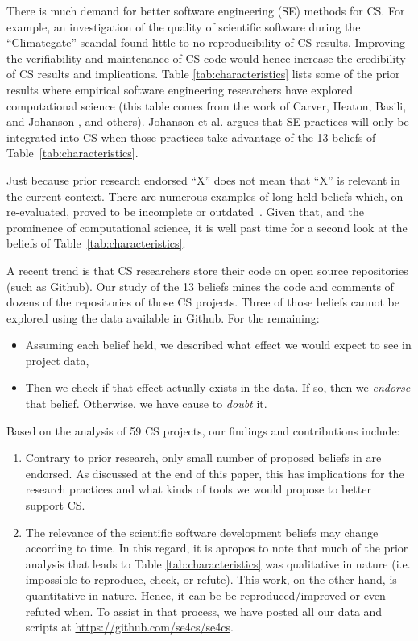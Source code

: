 \documentclass[sigconf]{acmart}
\newcommand{\bi}{\begin{itemize}}
\newcommand{\ei}{\end{itemize}}
\newcommand{\be}{\begin{enumerate}}
\newcommand{\ee}{\end{enumerate}}
\begin{document}
There is much demand for better software engineering (SE) methods
for CS. For example, an investigation of the 
quality of scientific software during the ``Climategate'' scandal \cite{merali10_error} found little to no reproducibility of CS results. Improving the verifiability and maintenance of CS code would hence increase the credibility of CS results and implications. Table \ref{tab:characteristics}
lists some of the prior results
where empirical software
engineering researchers have explored computational science
(this table comes from the work of
Carver, Heaton, Basili, and Johanson \cite{carver13_perception, carver07_environment, basili08_hpc, heaton15_lit, johan18_secs}, and others).
Johanson et al. \cite{johan18_secs}   argues that SE practices will only be integrated into CS when
those practices take advantage of
the   13 beliefs  of
Table~\ref{tab:characteristics}. 
 



Just  because  prior research endorsed
 ``X'' does not mean that  ``X'' is relevant in the current context. There are numerous examples of long-held beliefs which, on re-evaluated, proved to be incomplete or outdated~\cite{menzies17,dev16}. 
Given that, and the prominence  of 
computational science, it is 
well past time for a second look at the beliefs of 
Table~\ref{tab:characteristics}. 

A recent trend is that CS researchers store their code on open source repositories (such as Github).
Our study of the 13 beliefs mines the code and comments of dozens of the repositories of  those CS projects. Three of those beliefs cannot be explored using the data available in Github. For the remaining:
\bi
\item Assuming each belief held,
we described what effect   we would expect to see in project data,
\item Then we check if that effect actually exists in the data.
If so, then  we  {\em endorse} that belief. Otherwise, we have cause to {\em doubt} it. 
\ei

Based on the analysis of 59 CS projects, our findings and contributions include: 
\be
\item Contrary to prior research, only small number of proposed beliefs in \cite{johan18_secs} are endorsed. As discussed at the end of this paper, this has implications for the research practices and what kinds of tools we would propose to better support CS. 
\pagebreak
\item The relevance of the scientific software development beliefs may change according to time.
In this regard, it is apropos to note that
  much of the prior analysis that leads to Table \ref{tab:characteristics} was qualitative in nature (i.e. impossible to reproduce, check, or refute). This work, on the other hand, is quantitative in nature. Hence, it can be be reproduced/improved or even refuted when.  To assist in that process,  we have posted all our data and scripts at
\url{https://github.com/se4cs/se4cs}. 
\ee
\end{document}
